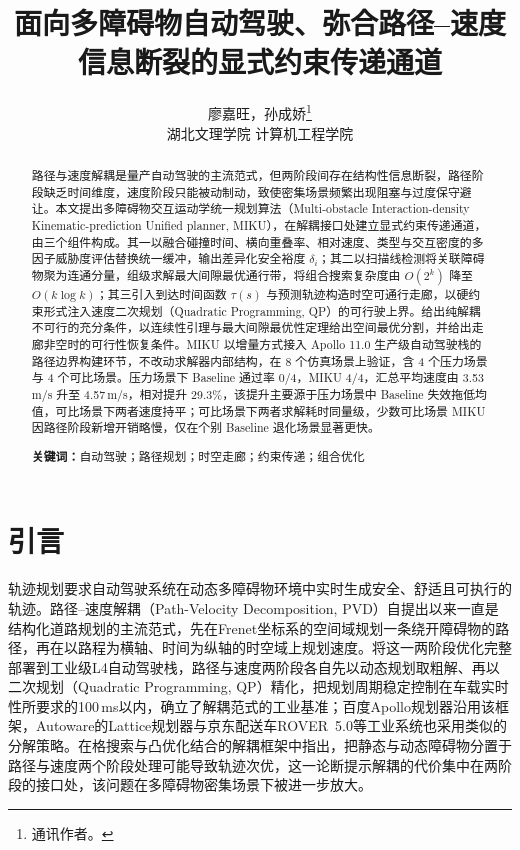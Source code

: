 \documentclass[a4paper,zihao=5]{ctexart}
\title{面向多障碍物自动驾驶、弥合路径--速度信息断裂的显式约束传递通道}
\author{廖嘉旺，孙成娇\thanks{通讯作者。}\\[2pt]\normalsize 湖北文理学院 计算机工程学院}
\date{}
\theoremstyle{definition}
\begin{document}
\maketitle

\begin{abstract}
\small
\noindent
路径与速度解耦是量产自动驾驶的主流范式，但两阶段间存在结构性信息断裂，路径阶段缺乏时间维度，速度阶段只能被动制动，致使密集场景频繁出现阻塞与过度保守避让。本文提出多障碍物交互运动学统一规划算法（Multi-obstacle Interaction-density Kinematic-prediction Unified planner, MIKU），在解耦接口处建立显式约束传递通道，由三个组件构成。其一以融合碰撞时间、横向重叠率、相对速度、类型与交互密度的多因子威胁度评估替换统一缓冲，输出差异化安全裕度 $\delta_i$；其二以扫描线检测将关联障碍物聚为连通分量，组级求解最大间隙最优通行带，将组合搜索复杂度由 $O(2^k)$ 降至 $O(k\log k)$；其三引入到达时间函数 $\tau(s)$ 与预测轨迹构造时空可通行走廊，以硬约束形式注入速度二次规划（Quadratic Programming, QP）的可行驶上界。给出纯解耦不可行的充分条件，以连续性引理与最大间隙最优性定理给出空间最优分割，并给出走廊非空时的可行性恢复条件。MIKU 以增量方式接入 Apollo 11.0 生产级自动驾驶栈的路径边界构建环节，不改动求解器内部结构，在 8 个仿真场景上验证，含 4 个压力场景与 4 个可比场景。压力场景下 Baseline 通过率 0/4，MIKU 4/4，汇总平均速度由 3.53\,m/s 升至 4.57\,m/s，相对提升 29.3\%，该提升主要源于压力场景中 Baseline 失效拖低均值，可比场景下两者速度持平；可比场景下两者求解耗时同量级，少数可比场景 MIKU 因路径阶段新增开销略慢，仅在个别 Baseline 退化场景显著更快。

\vspace{0.5em}
\noindent\textbf{关键词：}自动驾驶；路径规划；时空走廊；约束传递；组合优化
\end{abstract}
\section{引言}
\label{sec:intro}

轨迹规划要求自动驾驶系统在动态多障碍物环境中实时生成安全、舒适且可执行的轨迹。路径--速度解耦（Path-Velocity Decomposition, PVD）自\citet{kant1986pvd}提出以来一直是结构化道路规划的主流范式，先在Frenet坐标系的空间域规划一条绕开障碍物的路径，再在以路程为横轴、时间为纵轴的时空域上规划速度。\citet{fan2018baidu}将这一两阶段优化完整部署到工业级L4自动驾驶栈，路径与速度两阶段各自先以动态规划取粗解、再以二次规划（Quadratic Programming, QP）精化，把规划周期稳定控制在车载实时性所要求的100\,ms以内，确立了解耦范式的工业基准；百度Apollo规划器\citep{apollo2024}沿用该框架，Autoware的Lattice规划器与京东配送车ROVER~5.0\citep{wang2022_jfr}等工业系统也采用类似的分解策略。\citet{meng2019_access}在格搜索与凸优化结合的解耦框架中指出，把静态与动态障碍物分置于路径与速度两个阶段处理可能导致轨迹次优，这一论断提示解耦的代价集中在两阶段的接口处，该问题在多障碍物密集场景下被进一步放大\citep{gonzalez2016}。
\end{document}
